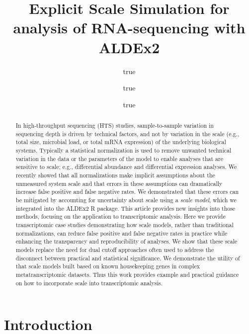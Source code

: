 \documentclass[
]{article}
\title{Explicit Scale Simulation for analysis of RNA-sequencing with
ALDEx2}
\author{true \and true \and true}
\date{}
\begin{document}
\maketitle
\begin{abstract}
In high-throughput sequencing (HTS) studies, sample-to-sample variation
in sequencing depth is driven by technical factors, and not by variation
in the scale (e.g., total size, microbial load, or total mRNA
expression) of the underlying biological systems. Typically a
statistical normalization is used to remove unwanted technical variation
in the data or the parameters of the model to enable analyses that are
sensitive to scale; e.g., differential abundance and differential
expression analyses. We recently showed that all normalizations make
implicit assumptions about the unmeasured system scale and that errors
in these assumptions can dramatically increase false positive and false
negative rates. We demonstrated that these errors can be mitigated by
accounting for uncertainty about scale using a \emph{scale model}, which
we integrated into the ALDEx2 R package. This article provides new
insights into those methods, focusing on the application to
transcriptomic analysis. Here we provide transcriptomic case studies
demonstrating how scale models, rather than traditional normalizations,
can reduce false positive and false negative rates in practice while
enhancing the transparency and reproducibility of analyses. We show that
these scale models replace the need for dual cutoff approaches often
used to address the disconnect between practical and statistical
significance. We demonstrate the utility of that scale models built
based on known housekeeping genes in complex metatranscriptomic
datasets. Thus this work provides example and practical guidance on how
to incorporate scale into transcriptomic analysis.
\end{abstract}

\section{Introduction}\label{introduction}

\doublespacing
\end{document}
